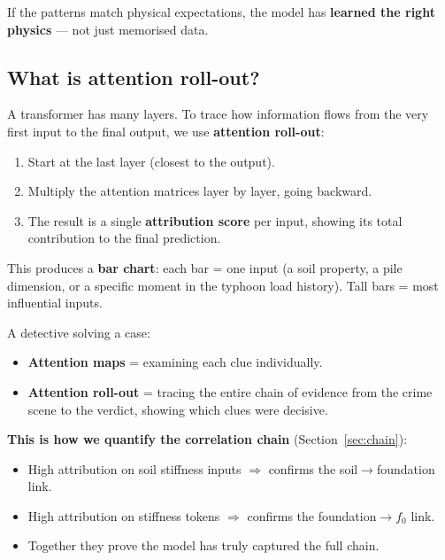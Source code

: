 \documentclass[11pt,a4paper]{article}
\begin{document}
If the patterns match physical expectations, the model has \textbf{learned
the right physics} --- not just memorised data.

\subsection{What is attention roll-out?}

A transformer has many layers.  To trace how information flows from the very
first input to the final output, we use \textbf{attention roll-out}:

\begin{enumerate}[noitemsep]
  \item Start at the last layer (closest to the output).
  \item Multiply the attention matrices layer by layer, going backward.
  \item The result is a single \textbf{attribution score} per input, showing
        its total contribution to the final prediction.
\end{enumerate}

This produces a \textbf{bar chart}: each bar = one input (a soil property,
a pile dimension, or a specific moment in the typhoon load history).
Tall bars = most influential inputs.

\begin{tcolorbox}[colback=yellow!5, colframe=yellow!50!black, title=Analogy]
A detective solving a case:
\begin{itemize}[noitemsep]
  \item \textbf{Attention maps} = examining each clue individually.
  \item \textbf{Attention roll-out} = tracing the entire chain of evidence
        from the crime scene to the verdict, showing which clues were
        decisive.
\end{itemize}
\end{tcolorbox}

\textbf{This is how we quantify the correlation chain}
(Section~\ref{sec:chain}):
\begin{itemize}[noitemsep]
  \item High attribution on soil stiffness inputs $\Rightarrow$ confirms the
        soil$\to$foundation link.
  \item High attribution on stiffness tokens $\Rightarrow$ confirms the
        foundation$\to$$f_0$ link.
  \item Together they prove the model has truly captured the full chain.
\end{itemize}
\end{document}
